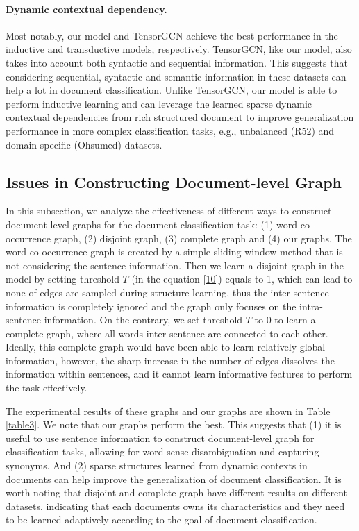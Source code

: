 \documentclass[letterpaper]{article} %
\begin{document}
\paragraph{Dynamic contextual dependency.} Most notably, our model and TensorGCN achieve the best performance in the inductive and transductive models, respectively.
TensorGCN, like our model, also takes into account both syntactic and sequential information. This suggests that considering sequential, syntactic and semantic information in these datasets can help a lot in document classification.
Unlike TensorGCN, our model is able to perform inductive learning and can leverage the learned sparse dynamic contextual dependencies from rich structured document to improve generalization performance in more complex classification tasks, e.g., unbalanced (R52) and domain-specific (Ohsumed) datasets.

\subsection{Issues in Constructing Document-level Graph}
In this subsection, we analyze the effectiveness of different ways to construct document-level graphs for the document classification task: (1) word co-occurrence graph, (2) disjoint graph, (3) complete graph and (4) our graphs. The word co-occurrence graph is created by a simple sliding window method that is not considering the sentence information. Then we learn a disjoint graph in the model by setting threshold $T$ (in the equation \ref{10}) equals to 1, which can lead to none of edges are sampled during structure learning, thus the inter sentence information is completely ignored and the graph only focuses on the intra-sentence information. On the contrary, we set threshold $T$ to 0 to learn a complete graph, where all words inter-sentence are connected to each other. Ideally, this complete graph would have been able to learn relatively global information, however, the sharp increase in the number of edges dissolves the information within sentences, and it cannot learn informative features to perform the task effectively.

The experimental results of these graphs and our graphs are shown in Table \ref{table3}. We note that our graphs perform the best. This suggests that (1) it is useful to use sentence information to construct document-level graph for classification tasks, allowing for word sense disambiguation and capturing synonyms. And (2) sparse structures learned from dynamic contexts in documents can help improve the generalization of document classification. It is worth noting that disjoint and complete graph have different results on different datasets, indicating that each documents owns its characteristics and they need to be learned adaptively according to the goal of document classification.
\end{document}
